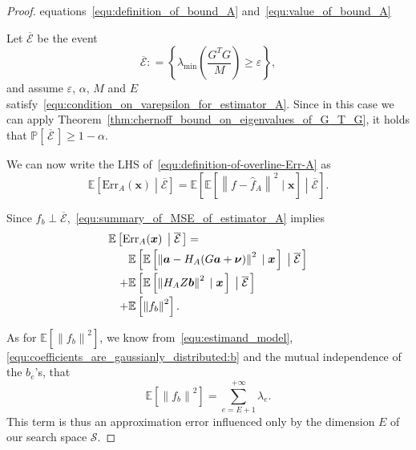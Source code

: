 \documentclass[10pt,twocolumn,twoside]{IEEEtran}					%
\theoremstyle	{plain}
\newcommand{\DefinedAs}			[0]	{\mathrel{\mathop:}=}
\newcommand{\Probability}			[0]	{\mathbb{P}}
\newcommand{\ProbabilityOf}			[1]	{\Probability \left[ #1 \right]}
\newcommand{\Expectation}					[0]	{\mathbb{E}}
\newcommand{\ExpectationOf}					[1]	{\Expectation \left[ #1 \right]}
\newcommand{\ExpectationOfGiven}			[2]	{\ExpectationOf{ #1 \; \left| \; #2 \right. }}
\newcommand	{\Theorem}				[0]	{Theorem}
\begin{document}
\begin{proof}{equations~\eqref{equ:definition_of_bound_A} and~\eqref{equ:value_of_bound_A}}

Let $\overline{\mathcal{E}}$ be the event
%
\begin{equation}
	\overline{\mathcal{E}}
	\DefinedAs
	\left\{
		\lambda_{\textrm{min}} \left( \frac{G^{T} G}{M} \right)
		\geq
		\varepsilon
	\right\} ,
	\label{equ:definition_of_the_event_mathcal_E}
\end{equation}
%
and assume $\varepsilon$, $\alpha$, $M$ and $E$ satisfy~\eqref{equ:condition_on_varepsilon_for_estimator_A}. Since in this case we can apply \Theorem~\ref{thm:chernoff_bound_on_eigenvalues_of_G_T_G}, it holds that $\ProbabilityOf{\, \overline{\mathcal{E}} \,} \geq 1 - \alpha$.

We can now write the \ac{LHS} of~\eqref{equ:definition-of-overline-Err-A} as
%
\begin{equation}
	\ExpectationOfGiven
	{\mathrm{Err}_{A}(\bm{x})}
	{\overline{\mathcal{E}}}
	=
	\ExpectationOfGiven
	{
		\ExpectationOfGiven{ \left\| f - \widehat{f}_{A} \right\|^{2} }{\bm{x}}
	}
	{\overline{\mathcal{E}}} .
	\label{equ:double-expectation}
\end{equation}

Since $f_{b} \perp \overline{\mathcal{E}}$,~\eqref{equ:summary_of_MSE_of_estimator_A} implies
%
\begin{equation}
	\begin{array}{l}
		\ExpectationOfGiven{\mathrm{Err}_{A}(\bm{x})}{\overline{\mathcal{E}}} \vspace{0.1cm} 
		= \\ \quad \phantom{+} \vspace{0.1cm} 
		\ExpectationOfGiven
		{
			\ExpectationOfGiven{\left\| \bm{a} - H_{A} ( G \bm{a} + \bm{\nu} ) \right\|^{2}}{\bm{x}}
		}
		{\overline{\mathcal{E}}} \\ \vspace{0.1cm}
		\quad +
		\ExpectationOfGiven
		{
			\ExpectationOfGiven{\left\| H_{A} Z \bm{b} \right\|^{2}}{\bm{x}}
		}
		{\overline{\mathcal{E}}}
		\\
		\quad + \ExpectationOf{ \left\| f_{b} \right\|^{2} }.
	\end{array}
	\label{equ:summary_of_MSE_of_estimator_A_conditioned_on_mathcal_E}
\end{equation}

As for $\ExpectationOf{ \left\| f_{b} \right\|^{2} }$, we know from~\eqref{equ:estimand_model}, \eqref{equ:coefficients_are_gaussianly_distributed:b} and the mutual independence of the $b_{e}$'s, that
%
\begin{equation}
	\ExpectationOf{ \left\| f_{b} \right\|^{2} } = \sum_{e = E + 1}^{+\infty} \lambda_{e} .
	\label{equ:third_MSE_term_for_estimator_A}
\end{equation}
%
This term is thus an approximation error influenced only by the dimension $E$ of our search space $\mathcal{S}$.


\end{proof}
\end{document}

